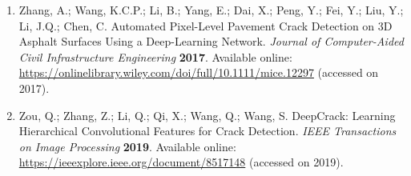 \documentclass[12pt,a4paper]{article}
\begin{document}
\begin{thebibliography}{99}
\begin{enumerate}
    \item Zhang, A.; Wang, K.C.P.; Li, B.; Yang, E.; Dai, X.; Peng, Y.; Fei, Y.; Liu, Y.; Li, J.Q.; Chen, C. Automated Pixel-Level Pavement Crack Detection on 3D Asphalt Surfaces Using a Deep-Learning Network. \textit{Journal of Computer-Aided Civil Infrastructure Engineering} \textbf{2017}.  
    Available online: \url{https://onlinelibrary.wiley.com/doi/full/10.1111/mice.12297} (accessed on 2017).
    
    \item Zou, Q.; Zhang, Z.; Li, Q.; Qi, X.; Wang, Q.; Wang, S. DeepCrack: Learning Hierarchical Convolutional Features for Crack Detection. \textit{IEEE Transactions on Image Processing} \textbf{2019}.  
    Available online: \url{https://ieeexplore.ieee.org/document/8517148} (accessed on 2019).
    
\end{enumerate}
\end{thebibliography}
\end{document}

